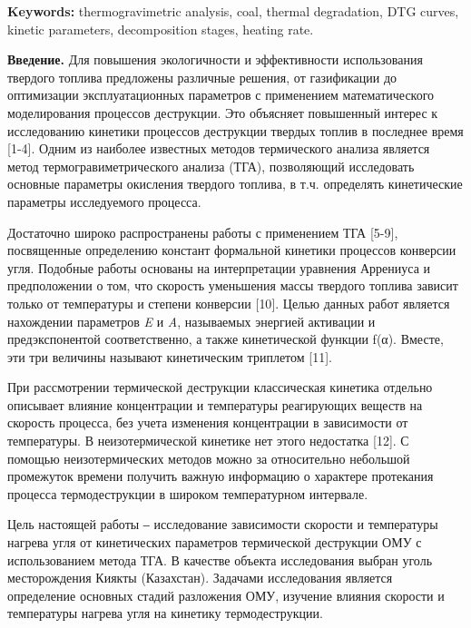 \hspace{1.5em} {\bfseries Keywords:} thermogravimetric analysis, coal, thermal
degradation, DTG curves, kinetic parameters, decomposition stages,
heating rate.

\vspace{1em}

\begin{multicols}{2}
{\bfseries Введение.} Для повышения экологичности и эффективности
использования твердого топлива предложены различные решения, от
газификации до оптимизации эксплуатационных параметров с применением
математического моделирования процессов деструкции. Это объясняет
повышенный интерес к исследованию кинетики процессов деструкции твердых
топлив в последнее время {[}1-4{]}. Одним из наиболее известных методов
термического анализа является метод термогравиметрического анализа
(ТГА), позволяющий исследовать основные параметры окисления твердого
топлива, в т.ч. определять кинетические параметры исследуемого процесса.

Достаточно широко распространены работы с применением ТГА {[}5-9{]},
посвященные определению констант формальной кинетики процессов конверсии
угля. Подобные работы основаны на интерпретации уравнения Аррениуса и
предположении о том, что скорость уменьшения массы твердого топлива
зависит только от температуры и степени конверсии {[}10{]}. Целью данных
работ является нахождении параметров \emph{E} и \emph{A}, называемых
энергией активации и предэкспонентой соответственно, а также
кинетической функции f(α). Вместе, эти три величины называют
кинетическим триплетом {[}11{]}.

При рассмотрении термической деструкции классическая кинетика отдельно
описывает влияние концентрации и температуры реагирующих веществ на
скорость процесса, без учета изменения концентрации в зависимости от
температуры. В неизотермической кинетике нет этого недостатка {[}12{]}.
С помощью неизотермических методов можно за относительно небольшой
промежуток времени получить важную информацию о характере протекания
процесса термодеструкции в широком температурном интервале.

Цель настоящей работы ‒ исследование зависимости скорости и температуры
нагрева угля от кинетических параметров термической деструкции ОМУ с
использованием метода ТГА. В качестве объекта исследования выбран уголь
месторождения Киякты (Казахстан). Задачами исследования является
определение основных стадий разложения ОМУ, изучение влияния скорости и
температуры нагрева угля на кинетику термодеструкции.


\end{multicols}
